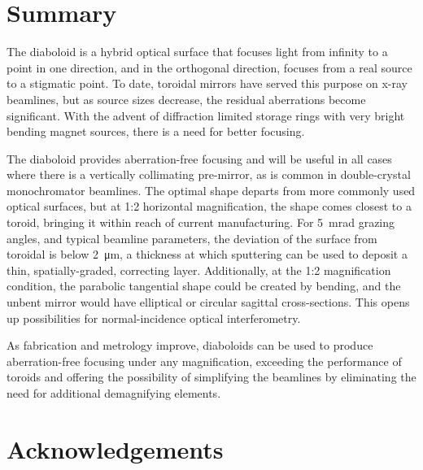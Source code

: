 \documentclass[preprint]{iucr}       %
\newcommand{\inred}[1]{{\color{red}#1}}
\begin{document}
\section{Summary}
\label{sec:summary}

The diaboloid is a hybrid optical surface that focuses light from infinity to a point in one direction, and in the orthogonal direction, focuses from a real source to a stigmatic point. To date, toroidal mirrors have served this purpose on x-ray beamlines, but as source sizes decrease, the residual aberrations become significant. With the advent of diffraction limited storage rings with very bright bending magnet sources, there is a need for better focusing. 

The diaboloid provides aberration-free focusing and will be useful in all cases where there is a vertically collimating pre-mirror, as is common in double-crystal monochromator beamlines. The optimal shape departs from more commonly used optical surfaces, but at 1:2 horizontal magnification, the shape comes closest to a toroid, bringing it within reach of current manufacturing.
For \SI{5}{\milli\radian} grazing angles, and typical beamline parameters, the deviation of the surface from toroidal is below \SI{2}{\micro\meter}, a thickness at which sputtering can be used to deposit a thin, spatially-graded, correcting layer. Additionally, at the 1:2 magnification condition, the parabolic tangential shape could be created by bending, and the unbent mirror would have elliptical or circular sagittal cross-sections. This opens up possibilities for normal-incidence optical interferometry.

As fabrication and metrology improve, diaboloids can be used to produce aberration-free focusing under any magnification, exceeding the performance of toroids and offering the possibility of \inred{simplifying the} beamlines by eliminating the need for additional demagnifying elements. 




\vspace{5mm}
\section{Acknowledgements}    
 
\end{document}
